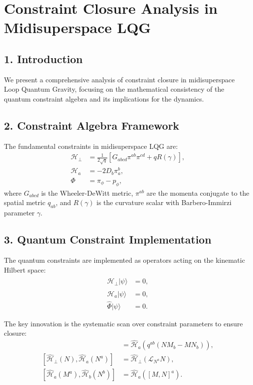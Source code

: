 \documentclass[12pt]{article}
\begin{document}
\section*{Constraint Closure Analysis in Midisuperspace LQG}

\subsection*{1. Introduction}
We present a comprehensive analysis of constraint closure in midisuperspace Loop Quantum Gravity, focusing on the mathematical consistency of the quantum constraint algebra and its implications for the dynamics.

\subsection*{2. Constraint Algebra Framework}
The fundamental constraints in midisuperspace LQG are:
\begin{align}
  \mathcal{H}_\perp &= \frac{1}{2\sqrt{q}}\left[G_{abcd}\pi^{ab}\pi^{cd} + q R(\gamma)\right], \\
  \mathcal{H}_a &= -2 D_b \pi^b_a, \\
  \Phi &= \pi_\phi - p_\phi,
\end{align}
where $G_{abcd}$ is the Wheeler-DeWitt metric, $\pi^{ab}$ are the momenta conjugate to the spatial metric $q_{ab}$, and $R(\gamma)$ is the curvature scalar with Barbero-Immirzi parameter $\gamma$.

\subsection*{3. Quantum Constraint Implementation}
The quantum constraints are implemented as operators acting on the kinematic Hilbert space:
\begin{align}
  \hat{\mathcal{H}}_\perp |\psi\rangle &= 0, \\
  \hat{\mathcal{H}}_a |\psi\rangle &= 0, \\
  \hat{\Phi} |\psi\rangle &= 0.
\end{align}

The key innovation is the systematic scan over constraint parameters to ensure closure:
\begin{align}
  [\hat{\mathcal{H}}_\perp(N), \hat{\mathcal{H}}_\perp(M)] &= \hat{\mathcal{H}}_a(q^{ab}(NM_b - MN_b)), \\
  [\hat{\mathcal{H}}_\perp(N), \hat{\mathcal{H}}_a(N^a)] &= \hat{\mathcal{H}}_\perp(\mathcal{L}_{N^a}N), \\
  [\hat{\mathcal{H}}_a(M^a), \hat{\mathcal{H}}_b(N^b)] &= \hat{\mathcal{H}}_a([M,N]^a).
\end{align}
\end{document}
